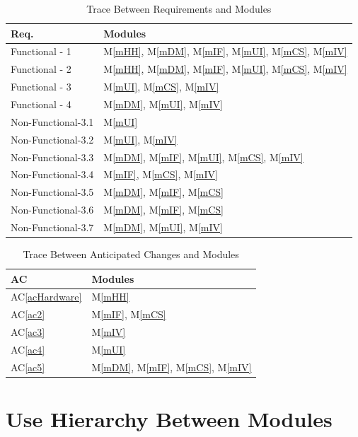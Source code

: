\documentclass[12pt, titlepage]{article}
\newcommand{\acref}[1]{AC\ref{#1}}
\newcommand{\mref}[1]{M\ref{#1}}
\begin{document}
\begin{table}[H]
\centering
\begin{tabular}{p{} p{}}
\toprule
\textbf{Req.} & \textbf{Modules}\\
\midrule
Functional - 1 & \mref{mHH}, \mref{mDM}, \mref{mIF}, \mref{mUI}, \mref{mCS}, \mref{mIV} \\
Functional - 2 & \mref{mHH}, \mref{mDM}, \mref{mIF}, \mref{mUI}, \mref{mCS}, \mref{mIV}\\
Functional - 3 & \mref{mUI}, \mref{mCS}, \mref{mIV} \\
Functional - 4 & \mref{mDM}, \mref{mUI}, \mref{mIV}\\
Non-Functional-3.1 & \mref{mUI}\\
Non-Functional-3.2 & \mref{mUI}, \mref{mIV}\\
Non-Functional-3.3 & \mref{mDM}, \mref{mIF}, \mref{mUI}, \mref{mCS}, \mref{mIV}\\
Non-Functional-3.4 & \mref{mIF}, \mref{mCS}, \mref{mIV}\\
Non-Functional-3.5 & \mref{mDM}, \mref{mIF}, \mref{mCS}\\
Non-Functional-3.6 & \mref{mDM}, \mref{mIF}, \mref{mCS}\\
Non-Functional-3.7 & \mref{mDM}, \mref{mUI}, \mref{mIV}\\
\bottomrule
\end{tabular}
\caption{Trace Between Requirements and Modules}
\label{TblRT}
\end{table}

\begin{table}[H]
\centering
\begin{tabular}{p{} p{}}
\toprule
\textbf{AC} & \textbf{Modules}\\
\midrule
\acref{acHardware} & \mref{mHH}\\
\acref{ac2} & \mref{mIF}, \mref{mCS}\\
\acref{ac3} & \mref{mIV}\\
\acref{ac4} & \mref{mUI}\\
\acref{ac5} & \mref{mDM}, \mref{mIF}, \mref{mCS}, \mref{mIV}\\

\bottomrule
\end{tabular}
\caption{Trace Between Anticipated Changes and Modules}
\label{TblACT}
\end{table}

\section{Use Hierarchy Between Modules} \label{SecUse}
\end{document}
